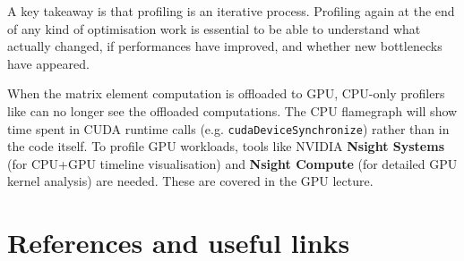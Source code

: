 \documentclass[11pt,a4paper]{article}
\begin{document}
A key takeaway is that profiling is an iterative process.
Profiling again at the end of any kind of optimisation work is essential to be able to understand what actually changed, if performances have improved, and whether new bottlenecks have appeared.

\begin{tipbox}
When the matrix element computation is offloaded to GPU, CPU-only profilers like \perf can no longer see the offloaded computations.
The CPU flamegraph will show time spent in CUDA runtime calls (e.g. \texttt{cudaDeviceSynchronize}) rather than in the code itself.
To profile GPU workloads, tools like NVIDIA \textbf{Nsight Systems} (for CPU+GPU timeline visualisation) and \textbf{Nsight Compute} (for detailed GPU kernel analysis) are needed.
These are covered in the GPU lecture.
\end{tipbox}

\section{References and useful links}
\nocite{*}
\printbibliography[heading=none]
\end{document}
